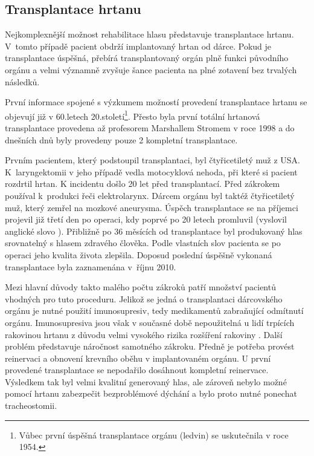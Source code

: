 
\subsection{Transplantace hrtanu} %
\label{sub:cause:treatment:transplantation}

Nejkomplexnější možnost rehabilitace hlasu představuje transplantace hrtanu.
V~tomto případě pacient obdrží implantovaný hrtan od dárce. Pokud je
transplantace úspěšná, přebírá transplantovaný orgán plně funkci původního
orgánu a velmi významně zvyšuje šance pacienta na plné zotavení bez trvalých
následků.

První informace spojené s výzkumem možností provedení transplantace hrtanu se
objevují již v 60.letech 20.století\footnote{Vůbec první úspěšná transplantace
orgánu (ledvin) se uskutečnila v roce 1954.}. Přesto byla první totální
hrtanová transplantace provedena až profesorem Marshallem Stromem v roce 1998
\cite{Narula2011} a do dnešních dnů byly provedeny pouze 2 kompletní
transplantace.

Prvním pacientem, který podstoupil transplantaci, byl čtyřicetiletý muž z USA.
K~laryngektomii v jeho případě vedla motocyklová nehoda, při které si pacient
rozdrtil hrtan. K incidentu došlo 20 let před transplantací. Před zákrokem
používal k~produkci řeči elektrolarynx. Dárcem orgánu byl taktéž čtyřicetiletý
muž, který zemřel na mozkové aneurysma. Úspěch transplantace se na příjemci
projevil již třetí den po operaci, kdy poprvé po 20 letech promluvil (vyslovil
anglické slovo ). Přibližně po 36 měsících od transplantace byl
produkovaný hlas srovnatelný s hlasem zdravého člověka. Podle vlastních slov
pacienta se po operaci jeho kvalita života  zlepšila.
\cite{Strome2001} Doposud poslední úspěšně vykonaná transplantace byla
zaznamenána v~říjnu 2010.

Mezi hlavní důvody takto malého počtu zákroků patří množství pacientů vhodných
pro tuto proceduru. Jelikož se jedná o transplantaci dárcovského orgánu je
nutné použití imunosupresiv, tedy medikamentů zabraňující odmítnutí orgánu.
Imunosupresiva jsou však v současné době nepoužitelná u lidí trpících
rakovinou hrtanu z důvodu velmi vysokého rizika rozšíření rakoviny
\cite{Narula2011}. Další problém představuje náročnost samotného zákroku.
Předně je potřeba provést reinervaci a obnovení krevního oběhu v implantovaném
orgánu. U první provedené transplantace se nepodařilo dosáhnout kompletní
reinervace. Výsledkem tak byl velmi kvalitní generovaný hlas, ale zároveň
nebylo možné pomocí hrtanu zabezpečit bezproblémové dýchání a bylo proto nutné
ponechat tracheostomii.

